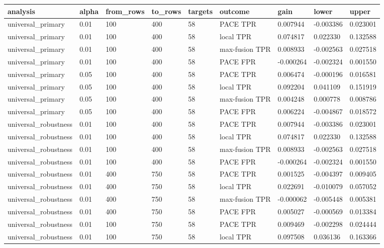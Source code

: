 \begin{tabular}{lllllllll}
\toprule
analysis & alpha & from\_rows & to\_rows & targets & outcome & gain & lower & upper \\
\midrule
universal\_primary & 0.01 & 100 & 400 & 58 & PACE TPR & 0.007944 & -0.003386 & 0.023001 \\
universal\_primary & 0.01 & 100 & 400 & 58 & local TPR & 0.074817 & 0.022330 & 0.132588 \\
universal\_primary & 0.01 & 100 & 400 & 58 & max-fusion TPR & 0.008933 & -0.002563 & 0.027518 \\
universal\_primary & 0.01 & 100 & 400 & 58 & PACE FPR & -0.000264 & -0.002324 & 0.001550 \\
universal\_primary & 0.05 & 100 & 400 & 58 & PACE TPR & 0.006474 & -0.000196 & 0.016581 \\
universal\_primary & 0.05 & 100 & 400 & 58 & local TPR & 0.092204 & 0.041109 & 0.151919 \\
universal\_primary & 0.05 & 100 & 400 & 58 & max-fusion TPR & 0.004248 & 0.000778 & 0.008786 \\
universal\_primary & 0.05 & 100 & 400 & 58 & PACE FPR & 0.006224 & -0.004867 & 0.018572 \\
universal\_robustness & 0.01 & 100 & 400 & 58 & PACE TPR & 0.007944 & -0.003386 & 0.023001 \\
universal\_robustness & 0.01 & 100 & 400 & 58 & local TPR & 0.074817 & 0.022330 & 0.132588 \\
universal\_robustness & 0.01 & 100 & 400 & 58 & max-fusion TPR & 0.008933 & -0.002563 & 0.027518 \\
universal\_robustness & 0.01 & 100 & 400 & 58 & PACE FPR & -0.000264 & -0.002324 & 0.001550 \\
universal\_robustness & 0.01 & 400 & 750 & 58 & PACE TPR & 0.001525 & -0.004397 & 0.009405 \\
universal\_robustness & 0.01 & 400 & 750 & 58 & local TPR & 0.022691 & -0.010079 & 0.057052 \\
universal\_robustness & 0.01 & 400 & 750 & 58 & max-fusion TPR & -0.000062 & -0.005448 & 0.005381 \\
universal\_robustness & 0.01 & 400 & 750 & 58 & PACE FPR & 0.005027 & -0.000569 & 0.013384 \\
universal\_robustness & 0.01 & 100 & 750 & 58 & PACE TPR & 0.009469 & -0.002298 & 0.024444 \\
universal\_robustness & 0.01 & 100 & 750 & 58 & local TPR & 0.097508 & 0.036136 & 0.163366 \\

\end{tabular}
